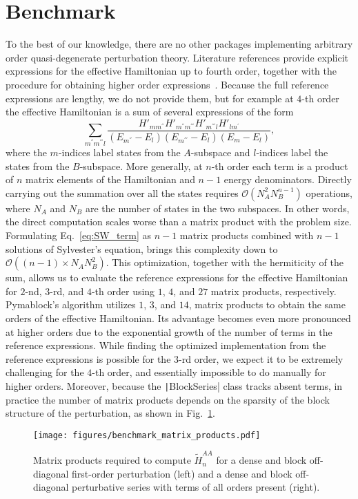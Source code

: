 \section{Benchmark}
\label{sec:benchmark}

To the best of our knowledge, there are no other packages implementing arbitrary order quasi-degenerate perturbation theory.
Literature references provide explicit expressions for the effective Hamiltonian up to fourth order, together with the procedure for obtaining higher order expressions~\cite{Winkler_2003}.
Because the full reference expressions are lengthy, we do not provide them, but for example at $4$-th order the effective Hamiltonian is a sum of several expressions of the form
\begin{equation}
\label{eq:SW_term}
\sum_{m^{''} m^{'''} l}
\frac{H'_{mm^{''}}H'_{m^{''}m^{'''}}H'_{m^{'''}l}H'_{lm^{'}}}{(E_{m^{''}}-E_{l})(E_{m^{'''}}-E_{l})(E_{m}-E_{l})},
\end{equation}
where the $m$-indices label states from the $A$-subspace and $l$-indices label the states from the $B$-subspace.
More generally, at $n$-th order each term is a product of $n$ matrix elements of the Hamiltonian and $n-1$ energy denominators.
Directly carrying out the summation over all the states requires $\mathcal{O}(N_A^2 N_B^{n-1})$ operations, where $N_A$ and $N_B$ are the number of states in the two subspaces.
In other words, the direct computation scales worse than a matrix product with the problem size.
Formulating Eq.~\eqref{eq:SW_term} as $n-1$ matrix products combined with $n-1$ solutions
of Sylvester's equation, brings this complexity down to $\mathcal{O}((n-1) \times N_A N_B^2)$.
This optimization, together with the hermiticity of the sum, allows us to evaluate the reference expressions for the effective Hamiltonian for $2$-nd, $3$-rd, and $4$-th order using $1$, $4$, and $27$ matrix products, respectively.
Pymablock's algorithm utilizes $1$, $3$, and $14$, matrix products to obtain the same orders of the effective Hamiltonian.
Its advantage becomes even more pronounced at higher orders due to the exponential growth of the number of terms in the reference expressions.
While finding the optimized implementation from the reference expressions is possible for the $3$-rd order, we expect it to be extremely challenging for the $4$-th order, and essentially impossible to do manually for higher orders.
Moreover, because the \texttt|BlockSeries| class tracks absent terms, in practice the number of matrix products depends on the sparsity of the block structure of the perturbation, as shown in Fig.~\ref{fig:benchmark_matrix_products}.
%
\begin{figure}[h]
    \centering
    \texttt{[image: figures/benchmark\_matrix\_products.pdf]}
    \caption{
        Matrix products required to compute $\tilde{H}^{AA}_{n}$ for
        a dense and block off-diagonal first-order perturbation (left) and a dense and block off-diagonal perturbative series with terms of all orders present (right).
        }
    \label{fig:benchmark_matrix_products}
\end{figure}
%

